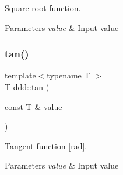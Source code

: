 Square root function. 


\begin{DoxyParams}{Parameters}
{\em value} & Input value \\
\hline
\end{DoxyParams}
\mbox{\label{namespaceddd_aeb0ca0d620545cbb5ef955eed88d1c0d}} 
\subsubsection{\texorpdfstring{tan()}{tan()}}
{\footnotesize\ttfamily template$<$typename T $>$ \\
T ddd\+::tan (\begin{DoxyParamCaption}\item[{const T \&}]{value }\end{DoxyParamCaption})\hspace{0.3cm}{\ttfamily [inline]}}



Tangent function \mbox{[}rad\mbox{]}. 


\begin{DoxyParams}{Parameters}
{\em value} & Input value \\
\hline
\end{DoxyParams}
